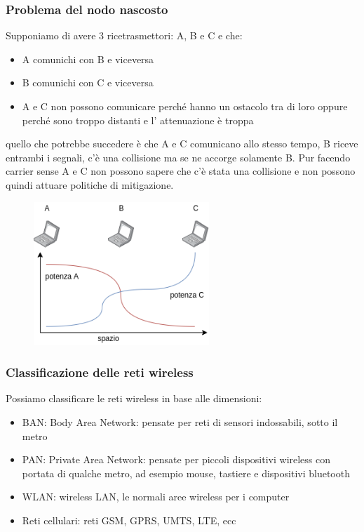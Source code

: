 \subsubsection{Problema del nodo nascosto}
Supponiamo di avere 3 ricetrasmettori: A, B e C e che:
\begin{itemize}
    \item A comunichi con B e viceversa
    \item B comunichi con C e viceversa
    \item A e C non possono comunicare perché hanno un ostacolo tra di loro oppure perché sono troppo distanti e l' attenuazione è troppa
\end{itemize}
quello che potrebbe succedere è che A e C comunicano allo stesso tempo, B riceve entrambi i segnali, c'è una collisione ma se ne accorge solamente B.
Pur facendo carrier sense A e C non possono sapere che c'è stata una collisione e non possono quindi attuare politiche di mitigazione.
\begin{figure}[H]
    \centering
    \includegraphics[width=250px]{images/8_Wireless_Mobile/wireless_attenuation.png}
\end{figure}

\subsubsection{Classificazione delle reti wireless}
Possiamo classificare le reti wireless in base alle dimensioni:
\begin{itemize}
    \item BAN: Body Area Network: pensate per reti di sensori indossabili, sotto il metro
    \item PAN: Private Area Network: pensate per piccoli dispositivi wireless con portata di qualche metro, ad esempio mouse, tastiere e dispositivi bluetooth
    \item WLAN: wireless LAN, le normali aree wireless per i computer
    \item Reti cellulari: reti GSM, GPRS, UMTS, LTE, ecc
\end{itemize}


